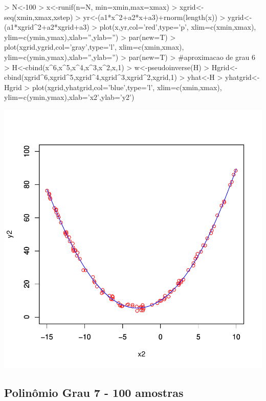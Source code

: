 \documentclass{article}
\begin{document}
\begin{Schunk}
\begin{Sinput}
>   N<-100
>   x<-runif(n=N, min=xmin,max=xmax)
>   xgrid<-seq(xmin,xmax,xstep)
>   yr<-(a1*x^2+a2*x+a3)+rnorm(length(x))
>   ygrid<-(a1*xgrid^2+a2*xgrid+a3)
>   plot(x,yr,col='red',type='p', xlim=c(xmin,xmax), ylim=c(ymin,ymax),xlab='',ylab='')
>   par(new=T)
>   plot(xgrid,ygrid,col='gray',type='l', xlim=c(xmin,xmax), ylim=c(ymin,ymax),xlab='',ylab='')
>   par(new=T)
>   #aproximacao de grau 6
>   H<-cbind(x^6,x^5,x^4,x^3,x^2,x,1)
>   w<-pseudoinverse(H) %
>   Hgrid<-cbind(xgrid^6,xgrid^5,xgrid^4,xgrid^3,xgrid^2,xgrid,1)
>   yhat<-H%
>   yhatgrid<-Hgrid%
>   plot(xgrid,yhatgrid,col='blue',type='l', xlim=c(xmin,xmax), ylim=c(ymin,ymax),xlab='x2',ylab='y2')
\end{Sinput}
\end{Schunk}
\includegraphics{aproximacao_polinomial-015}

\newpage
\subsection{Polinômio Grau 7 - 100 amostras}
\end{document}
